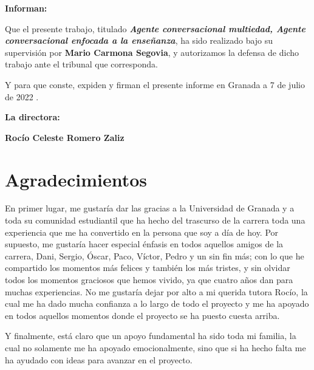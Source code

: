 \textbf{Informan:}

\vspace{0.5cm}

Que el presente trabajo, titulado \textit{\textbf{Agente conversacional multiedad, Agente conversacional enfocada a la enseñanza}},
ha sido realizado bajo su supervisión por \textbf{Mario Carmona Segovia}, y autorizamos la defensa de dicho trabajo ante el tribunal
que corresponda.

\vspace{0.5cm}

Y para que conste, expiden y firman el presente informe en Granada a 7 de julio de 2022 .

\vspace{1cm}

\textbf{La directora:}

\vspace{5cm}

\noindent \textbf{Rocío Celeste Romero Zaliz}

\chapter*{Agradecimientos}
\thispagestyle{empty}

       \vspace{1cm}


En primer lugar, me gustaría dar las gracias a la Universidad de Granada y a toda su comunidad estudiantil que ha hecho del trascurso de la carrera toda una experiencia que me ha convertido en la persona que soy a día de hoy. Por supuesto, me gustaría hacer especial énfasis en todos aquellos amigos de la carrera, Dani, Sergio, Óscar, Paco, Víctor, Pedro y un sin fin más; con lo que he compartido los momentos más felices y también los más tristes, y sin olvidar todos los momentos graciosos que hemos vivido, ya que cuatro años dan para muchas experiencias. No me gustaría dejar por alto a mi querida tutora Rocío, la cual me ha dado mucha confianza a lo largo de todo el proyecto y me ha apoyado en todos aquellos momentos donde el proyecto se ha puesto cuesta arriba.

Y finalmente, está claro que un apoyo fundamental ha sido toda mi familia, la cual no solamente me ha apoyado emocionalmente, sino que si ha hecho falta me ha ayudado con ideas para avanzar en el proyecto.
